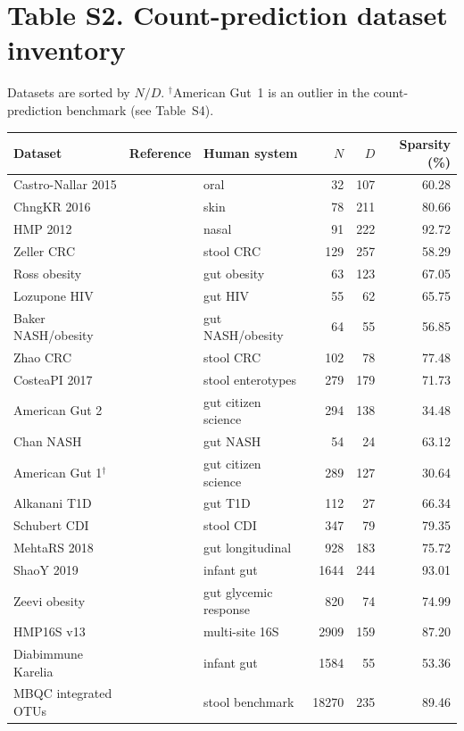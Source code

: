 \documentclass[11pt]{article}
\begin{document}
\section*{Table S2. Count-prediction dataset inventory}
Datasets are sorted by $N/D$.
$^\dagger$American Gut~1 is an outlier in the count-prediction benchmark (see Table~S4).
\footnotesize
\begin{center}
\begin{tabular}{>{\raggedright\arraybackslash}p{}>{\raggedright\arraybackslash}p{}>{\raggedright\arraybackslash}p{}rrr}
\toprule
Dataset & Reference & Human system & $N$ & $D$ & Sparsity (\%) \\
\midrule
Castro-Nallar 2015 & \citealt{CastroNallar2015} & oral & 32 & 107 & 60.28 \\
ChngKR 2016 & \citealt{Chng2016} & skin & 78 & 211 & 80.66 \\
HMP 2012 & \citealt{HMP2012} & nasal & 91 & 222 & 92.72 \\
Zeller CRC & \citealt{Zeller2014} & stool CRC & 129 & 257 & 58.29 \\
Ross obesity & \citealt{Ross2015} & gut obesity & 63 & 123 & 67.05 \\
Lozupone HIV & \citealt{Lozupone2013} & gut HIV & 55 & 62 & 65.75 \\
Baker NASH/obesity & \citealt{Zhu2013} & gut NASH/obesity & 64 & 55 & 56.85 \\
Zhao CRC & \citealt{Wang2012} & stool CRC & 102 & 78 & 77.48 \\
CosteaPI 2017 & \citealt{Costea2017} & stool enterotypes & 279 & 179 & 71.73 \\
American Gut 2 & \citealt{McDonald2018} & gut citizen science & 294 & 138 & 34.48 \\
Chan NASH & \citealt{Wong2013} & gut NASH & 54 & 24 & 63.12 \\
American Gut 1$^\dagger$ & \citealt{McDonald2018} & gut citizen science & 289 & 127 & 30.64 \\
Alkanani T1D & \citealt{Alkanani2015} & gut T1D & 112 & 27 & 66.34 \\
Schubert CDI & \citealt{Schubert2014} & stool CDI & 347 & 79 & 79.35 \\
MehtaRS 2018 & \citealt{Mehta2018} & gut longitudinal & 928 & 183 & 75.72 \\
ShaoY 2019 & \citealt{Shao2019} & infant gut & 1644 & 244 & 93.01 \\
Zeevi obesity & \citealt{Zeevi2015} & gut glycemic response & 820 & 74 & 74.99 \\
HMP16S v13 & \citealt{Huttenhower2012} & multi-site 16S & 2909 & 159 & 87.20 \\
Diabimmune Karelia & \citealt{Vatanen2016} & infant gut & 1584 & 55 & 53.36 \\
MBQC integrated OTUs & \citealt{MBQC2017} & stool benchmark & 18270 & 235 & 89.46 \\
\bottomrule
\end{tabular}
\end{center}
\normalsize
\end{document}

